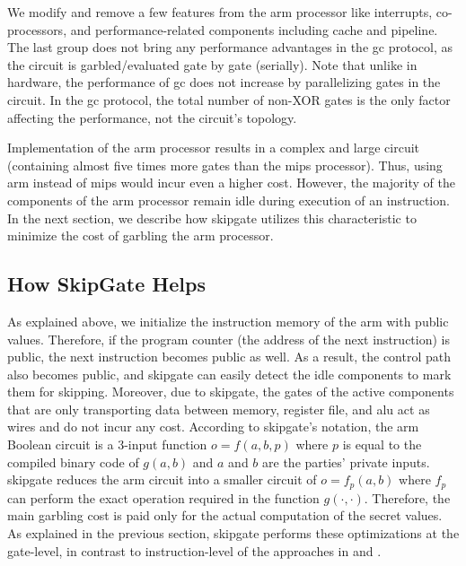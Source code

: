 We modify and remove a few features from the \gls{arm} processor like interrupts, co-processors, and performance-related components including cache and pipeline.
The last group does not bring any performance advantages in the \acrshort{gc} protocol, as the circuit is garbled/evaluated gate by gate (serially).
Note that unlike in hardware, the performance of \acrshort{gc} does not increase by parallelizing gates in the circuit.
In the \acrshort{gc} protocol, the total number of non-XOR gates is the only factor affecting the performance, not the circuit's topology.

Implementation of the \gls{arm} processor results in a complex and large circuit (containing almost five times more gates than the \gls{mips} processor).
Thus, using \gls{arm} instead of \gls{mips} would incur even a higher cost.
However, the majority of the components of the \gls{arm} processor remain idle during execution of an instruction.
In the next section, we describe how \gls{skipgate} utilizes this characteristic to minimize the cost of garbling the \gls{arm} processor.

\subsection{How {SkipGate} Helps}
As explained above, we initialize the instruction memory of the \gls{arm} with public values.
Therefore, if the program counter (the address of the next instruction) is public, the next instruction becomes public as well.
As a result, the control path also becomes public, and \gls{skipgate} can easily detect the idle components to mark them for skipping.
Moreover, due to \gls{skipgate}, the gates of the active components that are only transporting data between memory, register file, and \acrshort{alu} act as wires and do not incur any cost.
According to \gls{skipgate}'s notation, the \gls{arm} Boolean circuit is a 3-input function $o = f(a,b,p)$ where $p$ is equal to the compiled binary code of $g(a,b)$ and $a$ and $b$ are the parties' private inputs.
\gls{skipgate} reduces the \gls{arm} circuit into a smaller circuit of $o = f_p(a,b)$ where $f_p$ can perform the exact operation required in the function $g(\cdot,\cdot)$.
Therefore, the main garbling cost is paid only for the actual computation of the secret values.
As explained in the previous section, \gls{skipgate} performs these optimizations at the gate-level, in contrast to instruction-level of the approaches in  and \cite{wang2016secure}.

